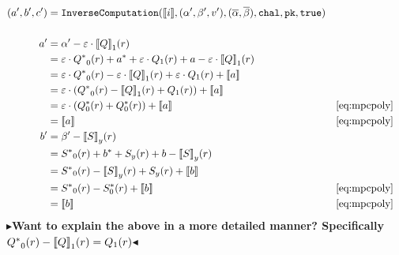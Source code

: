 \documentclass[11pt]{report}
\theoremstyle{definition}
\theoremstyle{plain}
\newcommand{\todo}[1]{{\color[rgb]{.5,0,0}\textbf{$\blacktriangleright$#1$\blacktriangleleft$}}}
\begin{document}
\begin{align*}
  (a', b', c') & = \texttt{InverseComputation}(\sh{i}, (\alpha', \beta', v'),
  (\overline{\alpha}, \overline{\beta}), \texttt{chal}, \texttt{pk}, \texttt{true})                                                              \\\\
  a'           & = \alpha' - \varepsilon \cdot {\sh{Q}}_1(r)                                                                                     \\
               & = \varepsilon \cdot {Q^*}_0(r) + a^* + \varepsilon \cdot Q_1(r) + a - \varepsilon \cdot {\sh{Q}}_1(r)                           \\
               & = \varepsilon \cdot {Q^*}_0(r) - \varepsilon \cdot {\sh{Q}}_1(r) + \varepsilon \cdot Q_1(r) + \sh{a}                            \\
               & = \varepsilon \cdot ({Q^*}_0(r) - {\sh{Q}}_1(r) +  Q_1(r)) + \sh{a}                                                             \\
               & = \varepsilon \cdot (Q^*_0(r) +  Q^*_0(r)) + \sh{a}                                                   &  & \autoref{eq:mpcpoly} \\
               & = \sh{a}                                                                                              &  & \autoref{eq:mpcpoly} \\
  b'           & = \beta' - {\sh{S}}_y(r)                                                                                                        \\
               & = {S^*}_0(r) + b^* + S_y(r) + b - {\sh{S}}_y(r)                                                                                 \\
               & = {S^*}_0(r) - {\sh{S}}_y(r) + S_y(r)  + \sh{b}                                                                                 \\
               & = {S^*}_0(r) - S^*_0(r)  + \sh{b}                                                                     &  & \autoref{eq:mpcpoly} \\
               & = \sh{b}                                                                                              &  & \autoref{eq:mpcpoly} \\
\end{align*}
\todo{Want to explain the above in a more detailed manner? Specifically ${Q^*}_0(r) - {\llbracket Q \rrbracket}_1(r) = Q_1(r)$}
\end{document}
